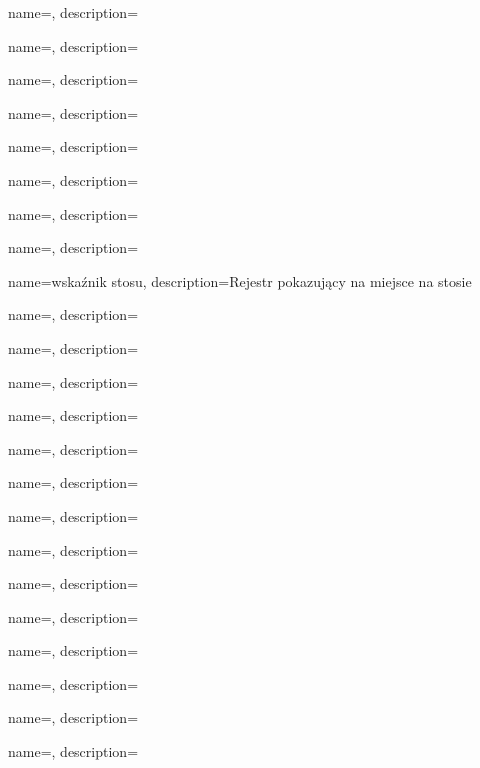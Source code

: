 {
  name={\PLph},
  description={\PLph}
}

{
  name={\PLph},
  description={\PLph}
}

{
  name={\PLph},
  description={\PLph}
}

{
  name={\PLph},
  description={\PLph}
}

{
  name={\PLph},
  description={\PLph}
}

{
  name={\PLph},
  description={\PLph}
}

{
  name={\PLph},
  description={\PLph}
}

{
  name={\PLph},
  description={\PLph}
}

{
  name=wskaźnik stosu,
  description={Rejestr pokazujący na miejsce na stosie}
}

{
  name={\PLph},
  description={\PLph}
}

{
  name={\PLph},
  description={\PLph}
}

{
  name={\PLph},
  description={\PLph}
}

{
  name={\PLph},
  description={\PLph}
}

{
  name={\PLph},
  description={\PLph}
}

{
  name={\PLph},
  description={\PLph}
}

{
  name={\PLph},
  description={\PLph}
}

{
  name={\PLph},
  description={\PLph}
}

{
  name={\PLph},
  description={\PLph}
} 

{
  name={\PLph},
  description={\PLph}
}

{
  name={\PLph},
  description={\PLph}
}

{
  name={\PLph},
  description={\PLph}
}

{
  name={\PLph},
  description={\PLph}
}

{
  name={\PLph},
  description={\PLph}
}


